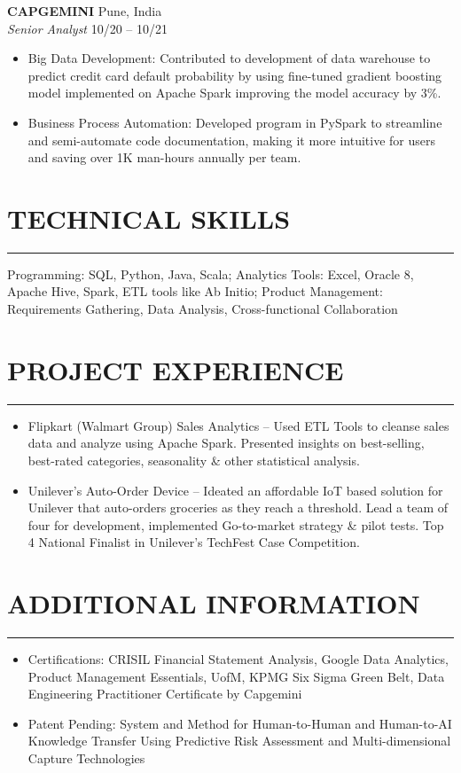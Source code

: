 \documentclass[10pt,letterpaper]{article}
\newcommand{\sectionline}{\par\vspace{-0.5em}\noindent\rule{\textwidth}{0.6pt}\vspace{0.3em}\par}
\begin{document}
\noindent\textbf{CAPGEMINI} \hfill Pune, India\\
\textit{Senior Analyst} \hfill 10/20 -- 10/21
\begin{itemize}
  \item Big Data Development: Contributed to development of data warehouse to predict credit card default probability by using fine-tuned gradient boosting model implemented on Apache Spark improving the model accuracy by 3\%.
  \item Business Process Automation: Developed program in PySpark to streamline and semi-automate code documentation, making it more intuitive for users and saving over 1K man-hours annually per team.
\end{itemize}

\section*{TECHNICAL SKILLS}
\sectionline
Programming: SQL, Python, Java, Scala; Analytics Tools: Excel, Oracle 8, Apache Hive, Spark, ETL tools like Ab Initio; Product Management: Requirements Gathering, Data Analysis, Cross-functional Collaboration

\section*{PROJECT EXPERIENCE}
\sectionline
\begin{itemize}
  \item Flipkart (Walmart Group) Sales Analytics -- Used ETL Tools to cleanse sales data and analyze using Apache Spark. Presented insights on best-selling, best-rated categories, seasonality \& other statistical analysis.
  \item Unilever's Auto-Order Device -- Ideated an affordable IoT based solution for Unilever that auto-orders groceries as they reach a threshold. Lead a team of four for development, implemented Go-to-market strategy \& pilot tests. Top 4 National Finalist in Unilever's TechFest Case Competition.
\end{itemize}

\section*{ADDITIONAL INFORMATION}
\sectionline
\begin{itemize}
  \item Certifications: CRISIL Financial Statement Analysis, Google Data Analytics, Product Management Essentials, UofM, KPMG Six Sigma Green Belt, Data Engineering Practitioner Certificate by Capgemini
  \item Patent Pending: System and Method for Human-to-Human and Human-to-AI Knowledge Transfer Using Predictive Risk Assessment and Multi-dimensional Capture Technologies
\end{itemize}
\end{document}
